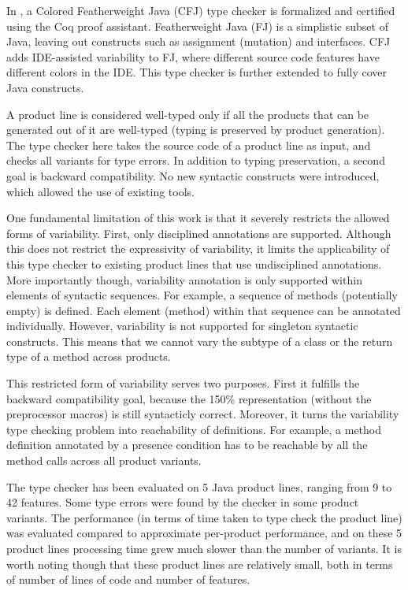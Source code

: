 \documentclass[11pt]{article}
\begin{document}
In \cite{Kastner:2012}, a Colored Featherweight Java (CFJ) type checker is formalized and certified using the Coq\cite{Bertot:2010} proof assistant. Featherweight Java (FJ) is a simplistic subset of Java, leaving out constructs such as assignment (mutation) and interfaces. CFJ adds IDE-assisted variability to FJ, where different source code features have different colors in the IDE. This type checker is further extended to fully cover Java constructs.

A product line is considered well-typed only if all the products that can be generated out of it are well-typed (typing is preserved by product generation). The type checker here takes the source code of a product line as input, and checks all variants for type errors. In addition to typing preservation, a second goal is backward compatibility. No new syntactic constructs were introduced, which allowed the use of existing tools.

One fundamental limitation of this work is that it severely restricts the allowed forms of variability. First, only disciplined annotations are supported. Although this does not restrict the expressivity of variability, it limits the applicability of this type checker to existing product lines that use undisciplined annotations. More importantly though, variability annotation is only supported within elements of syntactic sequences. For example, a sequence of methods (potentially empty) is defined. Each element (method) within that sequence can be annotated individually. However, variability is not supported for singleton syntactic constructs. This means that we cannot vary the subtype of a class or the return type of a method across products.

This restricted form of variability serves two purposes. First it fulfills the backward compatibility goal, because the 150\% representation (without the preprocessor macros) is still syntacticly correct. Moreover, it turns the variability type checking problem into reachability of definitions. For example, a method definition annotated by a presence condition has to be reachable by all the method calls across all product variants. 
 
The type checker has been evaluated on 5 Java product lines, ranging from 9 to 42 features. Some type errors were found by the checker in some product variants. The performance (in terms of time taken to type check the product line) was evaluated compared to approximate per-product performance, and on these 5 product lines processing time grew much slower than the number of variants. It is worth noting though that these product lines are relatively small, both in terms of number of lines of code and number of features. 
 
\end{document}
